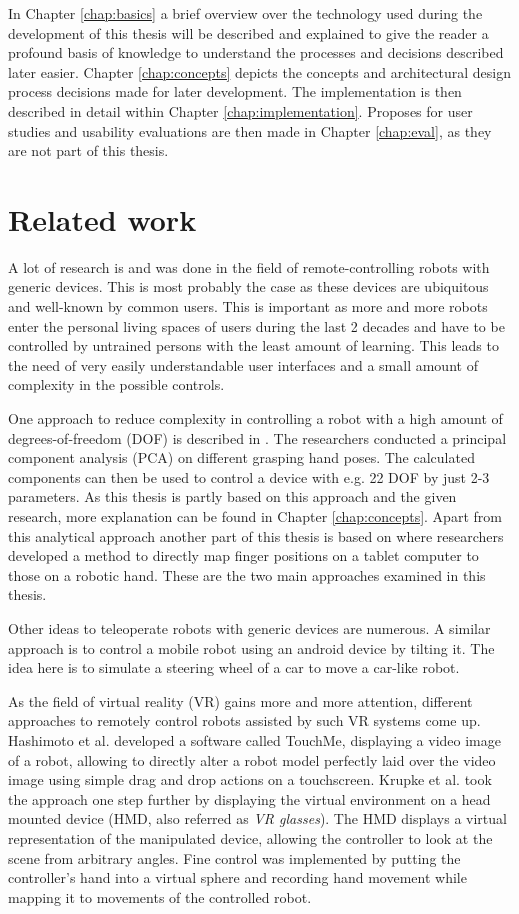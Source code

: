 In Chapter \ref{chap:basics} a brief overview over the technology used during the development of this thesis will be described and explained to give the reader a profound basis of knowledge to understand the processes and decisions described later easier. Chapter \ref{chap:concepts} depicts the concepts and architectural design process decisions made for later development. The implementation is then described in detail within Chapter \ref{chap:implementation}. Proposes for user studies and usability evaluations are then made in Chapter \ref{chap:eval}, as they are not part of this thesis.

\chapter{Related work}

A lot of research is and was done in the field of remote-controlling robots with generic devices. This is most probably the case as these devices are ubiquitous and well-known by common users. This is important as more and more robots enter the personal living spaces of users during the last 2 decades\cite{Forlizzi2006} and have to be controlled by untrained persons with the least amount of learning. This leads to the need of very easily understandable user interfaces and a small amount of complexity in the possible controls. 

One approach to reduce complexity in controlling a robot with a high amount of degrees-of-freedom (DOF) is described in \cite{Bernardino2013}. The researchers conducted a principal component analysis (PCA) on different grasping hand poses. The calculated components can then be used to control a device with e.g. 22 DOF by just 2-3 parameters. As this thesis is partly based on this approach and the given research, more explanation can be found in Chapter \ref{chap:concepts}. Apart from this analytical approach another part of this thesis is based on \cite{conf:humanoids:TohHLBZP12} where researchers developed a method to directly map finger positions on a tablet computer to those on a robotic hand. These are the two main approaches examined in this thesis.

Other ideas to teleoperate robots with generic devices are numerous. A similar approach is to control a mobile robot using an android device by tilting it\cite{Akupati2017}. The idea here is to simulate a steering wheel of a car to move a car-like robot. 

As the field of virtual reality (VR) gains more and more attention, different approaches to remotely control robots assisted by such VR systems come up. Hashimoto et al. developed a software called TouchMe, displaying a video image of a robot, allowing to directly alter a robot model perfectly laid over the video image using simple drag and drop actions on a touchscreen\cite{Hashimoto2013}. Krupke et al. took the approach one step further by displaying the virtual environment on a head mounted device (HMD, also referred as \textit{VR glasses}). The HMD displays a virtual representation of the manipulated device, allowing the controller to look at the scene from arbitrary angles. Fine control was implemented by putting the controller's hand into a virtual sphere and recording hand movement while mapping it to movements of the controlled robot.
